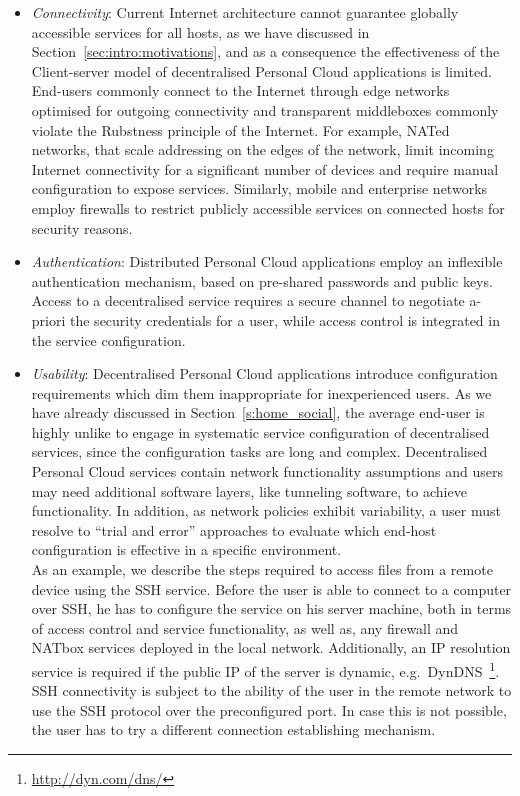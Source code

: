 \begin{itemize}
  \item {\it Connectivity}\/: Current Internet architecture cannot guarantee
        globally accessible services for all hosts, as we have discussed in
        Section~\ref{sec:intro:motivations}, and as a consequence the
        effectiveness of the Client-server model of decentralised Personal Cloud
        applications is limited.  End-users commonly connect to the Internet
        through edge networks optimised for outgoing connectivity and
        transparent middleboxes commonly violate the Rubstness principle of the
        Internet. For example, NATed networks, that scale addressing on the
        edges of the network, limit incoming Internet connectivity for a
        significant number of devices and require manual configuration to expose
        services. Similarly, mobile and enterprise networks employ firewalls to
        restrict publicly accessible services on connected hosts for security
        reasons.
  \item {\it Authentication}\/: Distributed Personal Cloud applications employ
        an inflexible authentication mechanism, based on pre-shared passwords
        and public keys. Access to a decentralised service requires a secure
        channel to negotiate  a-priori the security credentials for a user,
        while access control is integrated in the service configuration. 
  \item {\it Usability}\/: Decentralised Personal Cloud applications introduce
        configuration requirements which dim them inappropriate for
        inexperienced users. As we have already discussed in
        Section~\ref{s:home_social}, the average end-user is highly unlike to
        engage in systematic service configuration of decentralised services,
        since the configuration tasks are long and complex. Decentralised
        Personal Cloud services contain network functionality assumptions and
        users may need additional software layers, like tunneling software, to
        achieve functionality.  In addition, as network policies exhibit
        variability, a user must resolve to ``trial and error'' approaches to
        evaluate which end-host configuration is effective in a specific
        environment. \\ 
        As an example, we describe the steps required to access files from a
        remote device using the SSH service. Before the user is able to
        connect to a computer over SSH, he has to configure the service on his
        server machine, both in terms of access control and service
        functionality, as well as, any firewall and NATbox  services deployed in
        the local network. Additionally, an IP resolution service is required if
        the public IP of the server is dynamic, 
        e.g.~DynDNS~\footnote{\url{http://dyn.com/dns/}}\@.  SSH connectivity is
        subject to the ability of the user in the remote network to use the SSH
        protocol over the preconfigured port.  In case this is not possible, the
        user has to try a different connection establishing mechanism.
\end{itemize}

